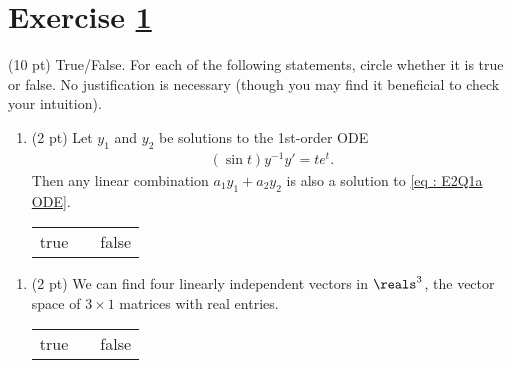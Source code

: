 %
%
%
%


\section{Exercise \ref{sec : Math211 Summer2019 Exam2 Q1}}
\label{sec : Math211 Summer2019 Exam2 Q1}

(10 pt) True/False. For each of the following statements, circle whether it is true or false. No justification is necessary (though you may find it beneficial to check your intuition).
\begin{enumerate}[label=(\alph*)]
\item\label{itm : E1Q1a} (2 pt) Let $y_{1}$ and $y_{2}$ be solutions to the 1st-order ODE
\begin{align}
(\sin t) y^{-1} y'
=
t e^{t}.%
\label{eq : E2Q1a ODE}
\end{align}
Then any linear combination $a_{1} y_{1} + a_{2} y_{2}$ is also a solution to \eqref{eq : E2Q1a ODE}. 
\begin{center}
\begin{tabular}{c c c}
true	&	\hspace{1in}	&	false
\end{tabular}
\end{center}
\end{enumerate}




\begin{enumerate}[resume,label=(\alph*)]
\item\label{itm : E1Q1b} (2 pt) We can find four linearly independent vectors in $\reals^{3}$, the vector space of $3 \times 1$ matrices with real entries.
\begin{center}
\begin{tabular}{c c c}
true	&	\hspace{1in}	&	false
\end{tabular}
\end{center}
\end{enumerate}

